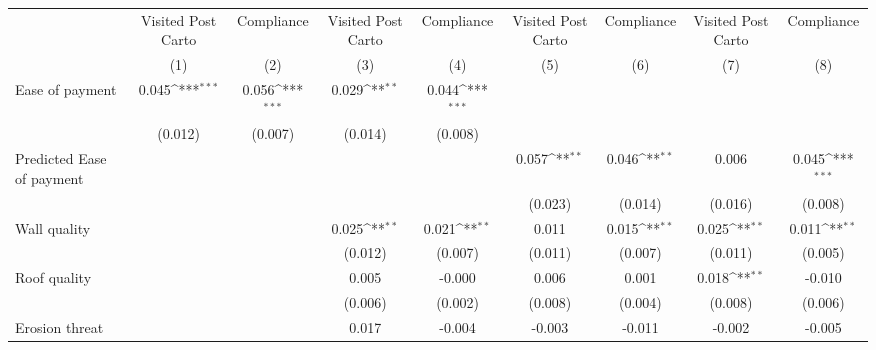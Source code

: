{
\def\sym#1{\ifmmode^{#1}\else\(^{#1}\)\fi}
\begin{tabular}{l*{8}{c}}
\toprule
                &\multicolumn{1}{c}{Visited Post Carto}&\multicolumn{1}{c}{Compliance}&\multicolumn{1}{c}{Visited Post Carto}&\multicolumn{1}{c}{Compliance}&\multicolumn{1}{c}{Visited Post Carto}&\multicolumn{1}{c}{Compliance}&\multicolumn{1}{c}{Visited Post Carto}&\multicolumn{1}{c}{Compliance}\\
                &\multicolumn{1}{c}{(1)}         &\multicolumn{1}{c}{(2)}         &\multicolumn{1}{c}{(3)}         &\multicolumn{1}{c}{(4)}         &\multicolumn{1}{c}{(5)}         &\multicolumn{1}{c}{(6)}         &\multicolumn{1}{c}{(7)}         &\multicolumn{1}{c}{(8)}         \\
\midrule
Ease of payment &    0.045\sym{***}&    0.056\sym{***}&    0.029\sym{**} &    0.044\sym{***}&                  &                  &                  &                  \\
                &  (0.012)         &  (0.007)         &  (0.014)         &  (0.008)         &                  &                  &                  &                  \\
Predicted Ease of payment&                  &                  &                  &                  &    0.057\sym{**} &    0.046\sym{**} &    0.006         &    0.045\sym{***}\\
                &                  &                  &                  &                  &  (0.023)         &  (0.014)         &  (0.016)         &  (0.008)         \\
Wall quality    &                  &                  &    0.025\sym{**} &    0.021\sym{**} &    0.011         &    0.015\sym{**} &    0.025\sym{**} &    0.011\sym{**} \\
                &                  &                  &  (0.012)         &  (0.007)         &  (0.011)         &  (0.007)         &  (0.011)         &  (0.005)         \\
Roof quality    &                  &                  &    0.005         &   -0.000         &    0.006         &    0.001         &    0.018\sym{**} &   -0.010         \\
                &                  &                  &  (0.006)         &  (0.002)         &  (0.008)         &  (0.004)         &  (0.008)         &  (0.006)         \\
Erosion threat  &                  &                  &    0.017         &   -0.004         &   -0.003         &   -0.011         &   -0.002         &   -0.005         \\

\end{tabular}}
